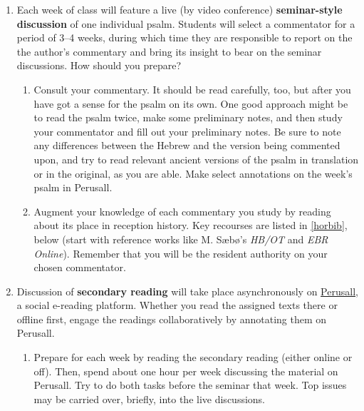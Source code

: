 \documentclass[titlepage]{article}
\begin{document}
\begin{enumerate}

	\item Each week of class will feature a live (by video conference)
	\textbf{seminar-style discussion} of one individual psalm. Students
	will select a commentator for a period of 3--4 weeks, during which
	time they are responsible to report on the the author's commentary
	and bring its insight to bear on the seminar discussions. How should
	you prepare?

	\begin{enumerate}

		\item Consult your commentary. It should be read carefully, too,
		but after you have got a sense for the psalm on its own. One
		good approach might be to read the psalm twice, make some
		preliminary notes, and then study your commentator and fill out
		your preliminary notes. Be sure to note any differences between
		the Hebrew and the version being commented upon, and try to read
		relevant ancient versions of the psalm in translation or in the
		original, as you are able. Make select annotations on the week's
		psalm in Perusall.

		\item Augment your knowledge of each commentary you study by
		reading about its place in reception history. Key recourses are
		listed in \autoref{horbib}, below (start with reference works
		like M. Sæbø's \emph{HB/OT} and \emph{EBR Online}). Remember
		that you will be the resident authority on your chosen
		commentator.

	\end{enumerate}


	\item Discussion of \textbf{secondary reading} will take place
	asynchronously on \href{https://app.perusall.com/}{Perusall}, a
	social e-reading platform. Whether you read the assigned texts there
	or offline first, engage the readings collaboratively by annotating
	them on Perusall.

	\begin{enumerate}

		\item Prepare for each week by reading the secondary reading
		(either online or off). Then, spend about one hour per week
		discussing the material on Perusall. Try to do both tasks before
		the seminar that week. Top issues may be carried over, briefly,
		into the live discussions.


\end{enumerate}
\end{enumerate}
\end{document}
